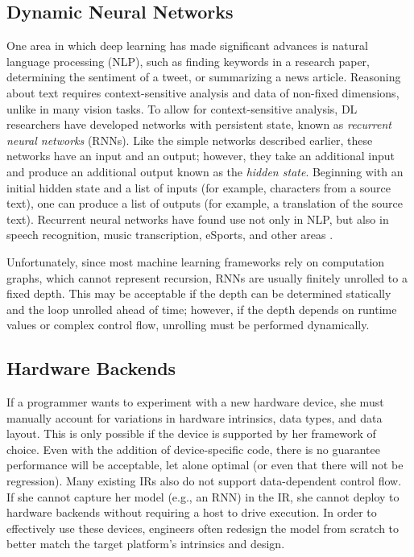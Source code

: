 \subsection{Dynamic Neural Networks}

One area in which deep learning has made significant advances is
  natural language processing (NLP), such as finding keywords in a
  research paper, determining the sentiment of a tweet,
  or summarizing a news article.
Reasoning about text requires context-sensitive analysis and data of
  non-fixed dimensions, unlike in many vision tasks.
To allow for context-sensitive analysis, DL researchers have developed networks with persistent
state, known as \textit{recurrent neural networks}  (RNNs). Like the simple networks described
earlier, these networks have an input and an output; however, they take an additional input and
produce an additional output known as the \textit{hidden state}. Beginning with an initial hidden
state and a list of inputs (for example, characters from a source text), one can produce a
list of outputs (for example, a translation of the source text). %
Recurrent neural networks have found use not only in NLP, but also in speech recognition, music
transcription, eSports, and other areas \citep{lstm, speech_recognition, OpenAI_dota}.

Unfortunately, since most machine learning frameworks rely on computation graphs,
  which cannot represent recursion, RNNs are usually finitely unrolled to a fixed depth.
This may be acceptable if the depth can be determined statically and the loop unrolled
  ahead of time; however, if the depth depends on runtime values or complex control flow,
  unrolling must be performed dynamically.

\subsection{Hardware Backends}

If a programmer wants to experiment with a new hardware device,
  she must manually account for variations in hardware intrinsics, data
  types, and data layout.
This is only possible if the device is supported by her framework of choice.
Even with the addition of device-specific code,
  there is no guarantee performance will be acceptable, let alone optimal
  (or even that there will not be regression).
Many existing IRs also do not support data-dependent control flow.
If she cannot capture her model (e.g., an RNN) in the IR,
  she cannot deploy to hardware backends without requiring a host to drive
  execution.
In order to effectively use these devices,
  engineers often redesign the model from scratch to better match the target
  platform's intrinsics and design.

